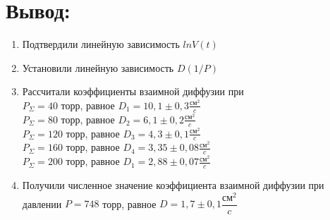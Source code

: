 \documentclass[a4paper,12pt]{article}
\begin{document}
\section{Вывод:}
\begin{enumerate}
\itemsep0em
\item Подтвердили линейную зависимость $lnV(t)$
\item Установили линейную зависимость $D(1/P)$
\item Рассчитали коэффициенты взаимной диффузии при \\
$P_{\Sigma} = 40$ торр, равное $D_1 = 10,1 \pm 0,3 \frac{\text{см}^2}{c}$ \\
$P_{\Sigma} = 80$ торр, равное $D_2 = 6,1 \pm 0,2 \frac{\text{см}^2}{c}$ \\
$P_{\Sigma} = 120$ торр, равное $D_3 = 4,3 \pm 0,1 \frac{\text{см}^2}{c}$ \\
$P_{\Sigma} = 160$ торр, равное $D_4 = 3,35 \pm 0,08 \frac{\text{см}^2}{c}$ \\
$P_{\Sigma} = 200$ торр, равное $D_1 = 2,88 \pm 0,07 \frac{\text{см}^2}{c}$  
\item Получили численное значение коэффициента взаимной диффузии при давлении $P = 748$ торр, равное $D = 1,7 \pm 0,1 \dfrac{\text{см}^2}{c}$
\end{enumerate}
\end{document}
